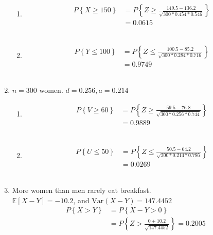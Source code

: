 \begin{enumerate}
		\begin{enumerate}
			\item 			
			\begin{align}
				P \left\{X \geq 150 \right\} &= P \left\{Z \geq \frac{149.5 - 136.2}{\sqrt{300*0.454*0.546}} \right\} \nonumber \\
				&= 0.0615
			\end{align} \\
			
			\item 
			\begin{align}
				P \left\{Y \leq 100 \right\} &= P \left\{Z \leq \frac{100.5 - 85.2}{\sqrt{300*0.284*0.716}} \right\} \nonumber \\
				&= 0.9749
			\end{align} \\
			
		\end{enumerate}
	
	
	\item $ n = 300 $ women. $ d = 0.256, a = 0.214 $ \\
	
		\begin{enumerate}
			\item 			
			\begin{align}
				P \left\{V \geq 60 \right\} &= P \left\{Z \geq \frac{59.5 - 76.8}{\sqrt{300*0.256*0.744}} \right\} \nonumber \\
				&= 0.9889
			\end{align} \\
			
			\item 
			\begin{align}
				P \left\{U \leq 50 \right\} &= P \left\{Z \leq \frac{50.5 - 64.2}{\sqrt{300*0.214*0.786}} \right\} \nonumber \\
				&= 0.0269
			\end{align} \\
			
		\end{enumerate}
	
	
	\item More women than men rarely eat breakfast.\\
	$ \mathbb{E}[X-Y] = -10.2 $, and $\mathrm{Var}(X-Y) = 147.4452$\\
	
		\begin{align}
			P \left\{X > Y \right\} &= P \left\{ X - Y > 0 \right\} \nonumber \\
			&= P \left\{ Z > \frac{0 + 10.2}{\sqrt{147.4452}}  \right\} = 0.2005
		\end{align} \\
	

\end{enumerate}
